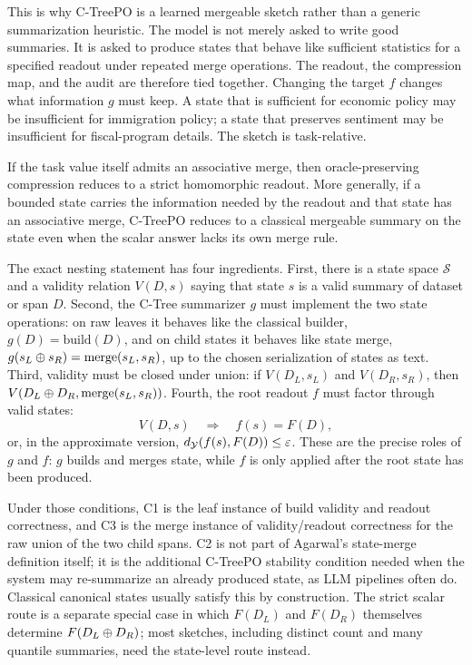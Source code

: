 This is why C-TreePO is a learned mergeable sketch rather than a generic
summarization heuristic. The model is not merely asked to write good
summaries. It is asked to produce states that behave like sufficient
statistics for a specified readout under repeated merge operations. The
readout, the compression map, and the audit are therefore tied together.
Changing the target $f$ changes what information $g$ must keep. A state that
is sufficient for economic policy may be insufficient for immigration policy;
a state that preserves sentiment may be insufficient for fiscal-program
details. The sketch is task-relative.

\begin{proposition}\label{prop:mergeable-reduction}
If the task value itself admits an associative merge, then oracle-preserving
compression reduces to a strict homomorphic readout. More generally, if a
bounded state carries the information needed by the readout and that state has
an associative merge, C-TreePO reduces to a classical mergeable summary on the
state even when the scalar answer lacks its own merge rule.
\end{proposition}

The exact nesting statement has four ingredients. First, there is a state
space $\mathcal{S}$ and a validity relation
$V(D,s)$ saying that state $s$ is a valid summary of dataset or span $D$.
Second, the C-Tree summarizer $g$ must implement the two state operations:
on raw leaves it behaves like the classical builder, $g(D)=\mathrm{build}(D)$,
and on child states it behaves like state merge,
$g(s_L\oplus s_R)=\mathrm{merge}(s_L,s_R)$, up to the chosen serialization
of states as text. Third, validity must be closed under union:
if $V(D_L,s_L)$ and $V(D_R,s_R)$, then
$V(D_L\oplus D_R,\mathrm{merge}(s_L,s_R))$. Fourth, the root readout $f$
must factor through valid states:
\[
  V(D,s) \quad\Longrightarrow\quad f(s)=F(D),
\]
or, in the approximate version,
$d_{\mathcal{Y}}(f(s),F(D))\le \varepsilon$. These are the precise roles of $g$ and
$f$: $g$ builds and merges state, while $f$ is only applied after the root
state has been produced.

Under those conditions, C1 is the leaf instance of build validity and readout
correctness, and C3 is the merge instance of validity/readout correctness for
the raw union of the two child spans. C2 is not part of Agarwal's state-merge
definition itself; it is the additional C-TreePO stability condition needed
when the system may re-summarize an already produced state, as LLM pipelines
often do. Classical canonical states usually satisfy this by construction.
The strict scalar route is a separate special case in which $F(D_L)$ and
$F(D_R)$ themselves determine $F(D_L\oplus D_R)$; most sketches, including
distinct count and many quantile summaries, need the state-level route instead.

